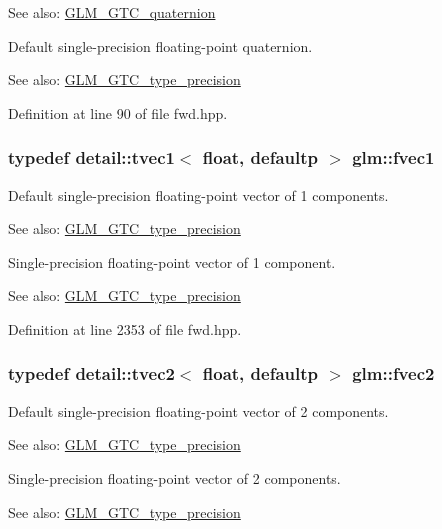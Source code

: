 \begin{Desc}
\item[See also:]\hyperlink{group__gtc__quaternion}{GLM\_\-GTC\_\-quaternion}\end{Desc}
Default single-precision floating-point quaternion. \begin{Desc}
\item[See also:]\hyperlink{group__gtc__type__precision}{GLM\_\-GTC\_\-type\_\-precision} \end{Desc}


Definition at line 90 of file fwd.hpp.\hypertarget{group__gtc__type__precision_gb927d62f22fa57461367011950cec650}{
\subsubsection[fvec1]{\setlength{\rightskip}{0pt plus 5cm}typedef detail::tvec1$<$ float, defaultp $>$ {\bf glm::fvec1}}}
\label{group__gtc__type__precision_gb927d62f22fa57461367011950cec650}


Default single-precision floating-point vector of 1 components. \begin{Desc}
\item[See also:]\hyperlink{group__gtc__type__precision}{GLM\_\-GTC\_\-type\_\-precision}\end{Desc}
Single-precision floating-point vector of 1 component. \begin{Desc}
\item[See also:]\hyperlink{group__gtc__type__precision}{GLM\_\-GTC\_\-type\_\-precision} \end{Desc}


Definition at line 2353 of file fwd.hpp.\hypertarget{group__gtc__type__precision_gafd518792a4646c7bb60aabc62a4684c}{
\subsubsection[fvec2]{\setlength{\rightskip}{0pt plus 5cm}typedef detail::tvec2$<$ float, defaultp $>$ {\bf glm::fvec2}}}
\label{group__gtc__type__precision_gafd518792a4646c7bb60aabc62a4684c}


Default single-precision floating-point vector of 2 components. \begin{Desc}
\item[See also:]\hyperlink{group__gtc__type__precision}{GLM\_\-GTC\_\-type\_\-precision}\end{Desc}
Single-precision floating-point vector of 2 components. \begin{Desc}
\item[See also:]\hyperlink{group__gtc__type__precision}{GLM\_\-GTC\_\-type\_\-precision} \end{Desc}


